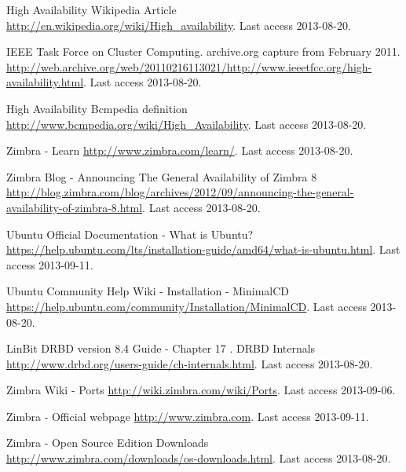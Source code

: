 
\begin{thebibliography}{1}


 High Availability Wikipedia Article
\url{http://en.wikipedia.org/wiki/High_availability}. Last access 2013-08-20.

 IEEE Task Force on Cluster Computing. archive.org capture from February 2011.
\url{http://web.archive.org/web/20110216113021/http://www.ieeetfcc.org/high-availability.html}. Last access 2013-08-20.

 High Availability Bcmpedia definition
\url{http://www.bcmpedia.org/wiki/High_Availability}. Last access 2013-08-20.

 Zimbra - Learn
\url{http://www.zimbra.com/learn/}. Last access 2013-08-20.

 Zimbra Blog - Announcing The General Availability of Zimbra 8
\url{http://blog.zimbra.com/blog/archives/2012/09/announcing-the-general-availability-of-zimbra-8.html}. Last access 2013-08-20.


 Ubuntu Official Documentation - What is Ubuntu?
\url{https://help.ubuntu.com/lts/installation-guide/amd64/what-is-ubuntu.html}. Last access 2013-09-11.

 Ubuntu Community Help Wiki - Installation - MinimalCD
\url{https://help.ubuntu.com/community/Installation/MinimalCD}. Last access 2013-08-20.

 LinBit DRBD version 8.4 Guide - Chapter 17 . DRBD Internals
\url{http://www.drbd.org/users-guide/ch-internals.html}. Last access 2013-08-20.


 Zimbra Wiki - Ports
\url{http://wiki.zimbra.com/wiki/Ports}. Last access 2013-09-06.


 Zimbra - Official webpage
\url{http://www.zimbra.com}. Last access 2013-09-11.

 Zimbra - Open Source Edition Downloads
\url{http://www.zimbra.com/downloads/os-downloads.html}. Last access 2013-08-20.



\end{thebibliography}
